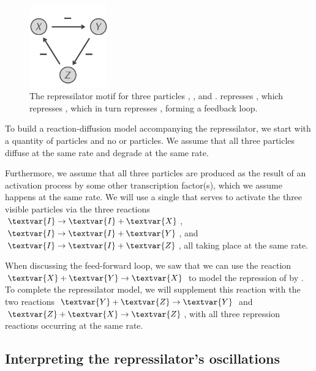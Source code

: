 \begin{figure}[h]
\centering
\mySfFamily
\includegraphics[width = 0.3\textwidth]{../images/repressilator.png}
\caption{The repressilator motif for three particles , , and .  represses , which represses , which in turn represses , forming a feedback loop.}
\label{fig:repressilator}
\end{figure}

\begin{qbox}\end{qbox}

To build a reaction-diffusion model accompanying the repressilator, we start with a quantity of  particles and no  or  particles. We assume that all three particles diffuse at the same rate and degrade at the same rate.

Furthermore, we assume that all three particles are produced as the result of an activation process by some other transcription factor(s), which we assume happens at the same rate. We will use a single   that serves to activate the three visible particles via the three reactions $\textvar{I} \rightarrow \textvar{I} + \textvar{X}$, $\textvar{I} \rightarrow \textvar{I} + \textvar{Y}$, and $\textvar{I} \rightarrow \textvar{I} + \textvar{Z}$, all taking place at the same rate.

When discussing the feed-forward loop, we saw that we can use the reaction $\textvar{X} + \textvar{Y} \rightarrow \textvar{X}$ to model the repression of  by . To complete the repressilator model, we will supplement this reaction with the two reactions $\textvar{Y} + \textvar{Z} \rightarrow \textvar{Y}$ and $\textvar{Z} + \textvar{X} \rightarrow \textvar{Z}$, with all three repression reactions occurring at the same rate.

\FloatBarrier
{}
\subsection{Interpreting the repressilator's oscillations}

